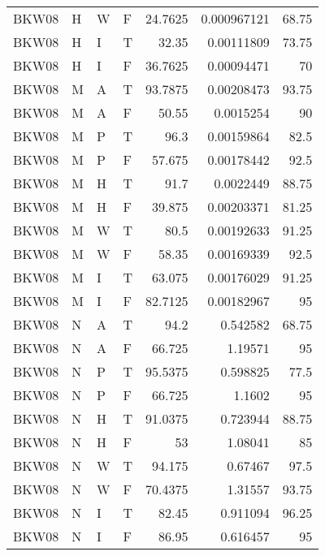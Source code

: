 \begin{table}[!htb]
{\begin{tabular}{llllrrr}
            BKW08    & H     & W     & F          & 24.7625    & 0.000967121 & 68.75    \\
            BKW08    & H     & I     & T          & 32.35      & 0.00111809  & 73.75    \\
            BKW08    & H     & I     & F          & 36.7625    & 0.00094471  & 70       \\
            BKW08    & M     & A     & T          & 93.7875    & 0.00208473  & 93.75    \\
            BKW08    & M     & A     & F          & 50.55      & 0.0015254   & 90       \\
            BKW08    & M     & P     & T          & 96.3       & 0.00159864  & 82.5     \\
            BKW08    & M     & P     & F          & 57.675     & 0.00178442  & 92.5     \\
            BKW08    & M     & H     & T          & 91.7       & 0.0022449   & 88.75    \\
            BKW08    & M     & H     & F          & 39.875     & 0.00203371  & 81.25    \\
            BKW08    & M     & W     & T          & 80.5       & 0.00192633  & 91.25    \\
            BKW08    & M     & W     & F          & 58.35      & 0.00169339  & 92.5     \\
            BKW08    & M     & I     & T          & 63.075     & 0.00176029  & 91.25    \\
            BKW08    & M     & I     & F          & 82.7125    & 0.00182967  & 95       \\
            BKW08    & N     & A     & T          & 94.2       & 0.542582    & 68.75    \\
            BKW08    & N     & A     & F          & 66.725     & 1.19571     & 95       \\
            BKW08    & N     & P     & T          & 95.5375    & 0.598825    & 77.5     \\
            BKW08    & N     & P     & F          & 66.725     & 1.1602      & 95       \\
            BKW08    & N     & H     & T          & 91.0375    & 0.723944    & 88.75    \\
            BKW08    & N     & H     & F          & 53         & 1.08041     & 85       \\
            BKW08    & N     & W     & T          & 94.175     & 0.67467     & 97.5     \\
            BKW08    & N     & W     & F          & 70.4375    & 1.31557     & 93.75    \\
            BKW08    & N     & I     & T          & 82.45      & 0.911094    & 96.25    \\
            BKW08    & N     & I     & F          & 86.95      & 0.616457    & 95       \\
            \hline
        \end{tabular}
    }{}
\end{table}